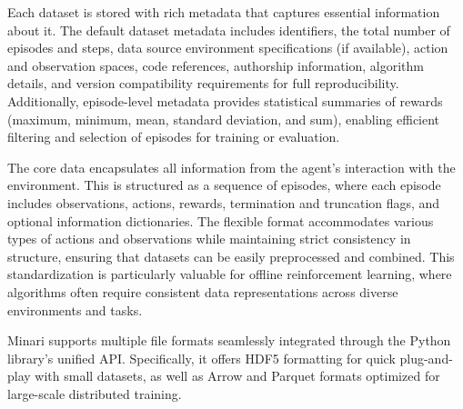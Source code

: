 \documentclass{article}
\begin{document}
Each dataset is stored with rich metadata that captures essential information about it. The default dataset metadata includes identifiers, the total number of episodes and steps, data source environment specifications (if available), action and observation spaces, code references, authorship information, algorithm details, and version compatibility requirements for full reproducibility. Additionally, episode-level metadata provides statistical summaries of rewards (maximum, minimum, mean, standard deviation, and sum), enabling efficient filtering and selection of episodes for training or evaluation.

The core data encapsulates all information from the agent's interaction with the environment. This is structured as a sequence of episodes, where each episode includes observations, actions, rewards, termination and truncation flags, and optional information dictionaries. The flexible format accommodates various types of actions and observations while maintaining strict consistency in structure, ensuring that datasets can be easily preprocessed and combined. This standardization is particularly valuable for offline reinforcement learning, where algorithms often require consistent data representations across diverse environments and tasks.

Minari supports multiple file formats seamlessly integrated through the Python library's unified API. Specifically, it offers HDF5 formatting for quick plug-and-play with small datasets, as well as Arrow and Parquet formats optimized for large-scale distributed training.
\end{document}
